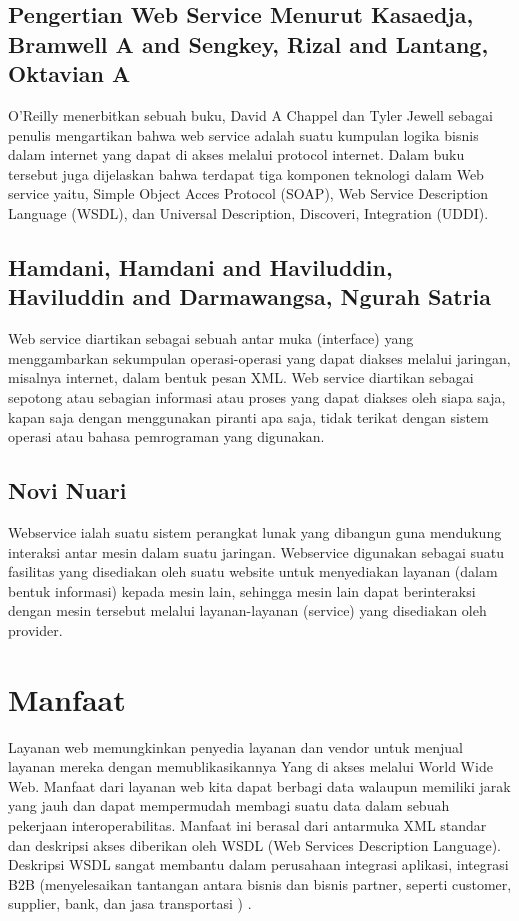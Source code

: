 \documentclass[12pt]{article}
\begin{document}
\subsection{Pengertian Web Service Menurut Kasaedja, Bramwell A and Sengkey, Rizal and Lantang, Oktavian A}

O’Reilly menerbitkan sebuah buku, David A Chappel dan Tyler Jewell sebagai penulis mengartikan bahwa web service adalah suatu kumpulan logika bisnis dalam internet yang dapat di akses melalui protocol internet. Dalam buku tersebut juga dijelaskan bahwa terdapat tiga komponen teknologi dalam Web service yaitu, Simple Object Acces Protocol (SOAP), Web Service Description Language (WSDL), dan Universal Description, Discoveri, Integration (UDDI)\cite{kasaedja2014rancang}.

\subsection{Hamdani, Hamdani and Haviluddin, Haviluddin and Darmawangsa, Ngurah Satria}

Web service diartikan sebagai sebuah antar muka (interface) yang menggambarkan sekumpulan operasi-operasi yang dapat diakses melalui jaringan, misalnya internet, dalam bentuk pesan XML. Web service diartikan sebagai sepotong atau sebagian informasi atau proses yang dapat diakses oleh siapa saja, kapan saja dengan menggunakan piranti apa saja, tidak terikat dengan sistem operasi atau bahasa pemrograman yang digunakan.

\subsection{Novi Nuari}

Webservice ialah suatu sistem perangkat lunak yang dibangun guna mendukung interaksi antar mesin dalam suatu jaringan. Webservice digunakan sebagai suatu fasilitas yang disediakan oleh suatu website untuk menyediakan layanan (dalam bentuk informasi) kepada mesin lain, sehingga mesin lain dapat berinteraksi dengan mesin tersebut melalui layanan-layanan (service) yang disediakan oleh provider\cite{nuari2014perancangan}.

\section{Manfaat}

Layanan web memungkinkan penyedia layanan dan vendor untuk menjual layanan mereka dengan memublikasikannya
Yang di akses melalui World Wide Web.
Manfaat dari layanan web kita dapat berbagi data walaupun memiliki jarak yang jauh dan dapat mempermudah membagi suatu data dalam sebuah pekerjaan
interoperabilitas. Manfaat ini berasal dari antarmuka XML standar dan deskripsi akses
diberikan oleh WSDL (Web Services Description Language). Deskripsi WSDL sangat membantu dalam perusahaan
integrasi aplikasi, integrasi B2B (menyelesaikan tantangan antara bisnis dan bisnis partner, seperti customer, supplier, bank, dan jasa transportasi ) \cite{ferris2003web}.
\end{document}

